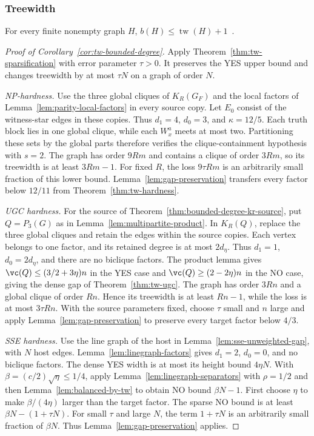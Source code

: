 \subsubsection{Treewidth}
\label{app:bounded-degree-treewidth}

\begin{lemma}
\label{lem:balanced-by-tw}
For every finite nonempty graph $H$,
$b(H)\leq\operatorname{tw}(H)+1$~\cite[Lemma~5.3]{APW}.
\end{lemma}

\begin{proof}[Proof of Corollary~\ref{cor:tw-bounded-degree}]
Apply Theorem~\ref{thm:tw-sparsification} with error parameter
$\tau>0$. It preserves the YES upper bound and changes treewidth
by at most $\tau N$ on a graph of order $N$.

\emph{NP-hardness.}
Use the three global cliques of $K_R(G_F)$ and the local factors
of Lemma~\ref{lem:parity-local-factors} in every source copy.
Let $E_0$ consist of the witness-star edges in these copies.
Thus $d_1=4$, $d_0=3$, and $\kappa=12/5$.
Each truth block lies in one global clique, while each $W_x^a$
meets at most two. Partitioning these sets by the global parts
therefore verifies the clique-containment hypothesis with $s=2$.
The graph has order $9Rm$ and contains a clique of order $3Rm$,
so its treewidth is at least $3Rm-1$. For fixed $R$, the loss
$9\tau Rm$ is an arbitrarily small fraction of this lower bound.
Lemma~\ref{lem:gap-preservation} transfers every factor below
$12/11$ from Theorem~\ref{thm:tw-hardness}.

\emph{UGC hardness.}
For the source of Theorem~\ref{thm:bounded-degree-kr-source}, put
$Q=P_3(G)$ as in Lemma~\ref{lem:multipartite-product}. In $K_R(Q)$,
replace the three global cliques and retain the edges within the
source copies. Each vertex belongs to one factor, and its retained
degree is at most $2d_\eta$. Thus $d_1=1$, $d_0=2d_\eta$, and
there are no biclique factors. The product lemma gives
$\vc(Q)\le(3/2+3\eta)n$ in the YES case and
$\vc(Q)\ge(2-2\eta)n$ in the NO case, giving the dense gap of
Theorem~\ref{thm:tw-ugc}.
The graph has order $3Rn$ and a global clique of order $Rn$.
Hence its treewidth is at least $Rn-1$, while the loss is at most
$3\tau Rn$. With the source parameters fixed, choose $\tau$ small
and $n$ large and apply Lemma~\ref{lem:gap-preservation} to preserve
every target factor below $4/3$.

\emph{SSE hardness.}
Use the line graph of the host in Lemma~\ref{lem:sse-unweighted-gap},
with $N$ host edges. Lemma~\ref{lem:linegraph-factors} gives
$d_1=2$, $d_0=0$, and no biclique factors. The dense YES width is
at most its height bound $4\eta N$. With
$\beta=(c/2)\sqrt\eta\le1/4$, apply
Lemma~\ref{lem:linegraph-separators} with $\rho=1/2$ and then
Lemma~\ref{lem:balanced-by-tw} to obtain NO bound $\beta N-1$.
First choose $\eta$ to make $\beta/(4\eta)$ larger than the target
factor. The sparse NO bound is at least $\beta N-(1+\tau N)$.
For small $\tau$ and large $N$, the term $1+\tau N$ is an
arbitrarily small fraction of $\beta N$. Thus
Lemma~\ref{lem:gap-preservation} applies.
\end{proof}

